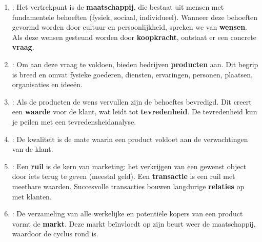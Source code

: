 \documentclass[a4paper,11pt]{article}
\begin{document}
\begin{enumerate}
    \item {}: Het vertrekpunt is de \textbf{maatschappij},
     die bestaat uit mensen met fundamentele behoeften (fysiek, sociaal, individueel). 
     Wanneer deze behoeften gevormd worden door cultuur en persoonlijkheid, spreken we van \textbf{wensen}. 
     Als deze wensen gesteund worden door \textbf{koopkracht}, ontstaat er een concrete \textbf{vraag}.
    \item {}: Om aan deze vraag te voldoen, bieden bedrijven \textbf{producten} aan. 
    Dit begrip is breed en omvat fysieke goederen, diensten, ervaringen, personen, plaatsen, organisaties en ideeën.
    \item {}: 
    Als de producten de wens vervullen zijn de behoeftes bevredigd.
    Dit creert een \textbf{waarde} voor de klant, wat leidt tot \textbf{tevredenheid}.
    De tevredenheid kun je peilen met een tevredensheidanalyse.
    \item {}:
    De kwaliteit is de mate waarin een product voldoet aan de verwachtingen van de klant.

    \item {}: Een \textbf{ruil} is de kern van marketing: het verkrijgen 
    van een gewenst object door iets terug te geven (meestal geld). 
    Een \textbf{transactie} is een ruil met meetbare waarden. Succesvolle transacties bouwen langdurige \textbf{relaties} op met klanten.
    \item {}: De verzameling van alle werkelijke en potentiële kopers van een product vormt de
     \textbf{markt}. Deze markt beïnvloedt op zijn beurt weer de maatschappij, waardoor de cyclus rond is.
\end{enumerate}
\end{document}
